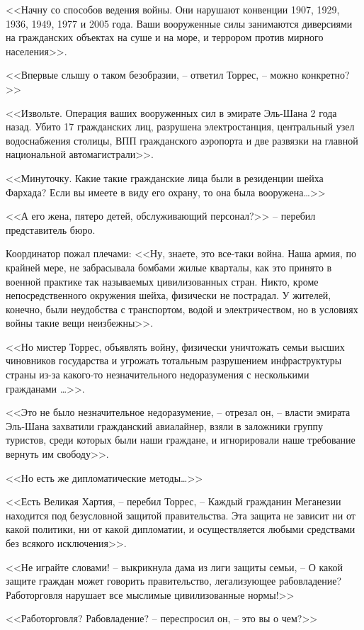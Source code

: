 <<Начну со способов ведения войны. Они нарушают конвенции 1907, 1929, 1936, 1949, 1977 и 2005 года. Ваши вооруженные силы занимаются диверсиями на гражданских объектах на суше и на море, и террором против мирного населения>>.

<<Впервые слышу о таком безобразии, -- ответил Торрес, -- можно конкретно?>>

<<Извольте. Операция ваших вооруженных сил в эмирате Эль-Шана 2 года назад. Убито 17 гражданских лиц, разрушена электростанция, центральный узел водоснабжения столицы, ВПП гражданского аэропорта и две развязки на главной национальной автомагистрали>>.

<<Минуточку. Какие такие гражданские лица были в резиденции шейха Фархада? Если вы имеете в виду его охрану, то она была вооружена\ldots{}>>

<<А его жена, пятеро детей, обслуживающий персонал?>> -- перебил представитель бюро.

Координатор пожал плечами: <<Ну, знаете, это все-таки война. Наша армия, по крайней мере, не забрасывала бомбами жилые кварталы, как это принято в военной практике так называемых цивилизованных стран. Никто, кроме непосредственного окружения шейха, физически не пострадал. У жителей, конечно, были неудобства с транспортом, водой и электричеством, но в условиях войны такие вещи неизбежны>>.

<<Но мистер Торрес, объявлять войну, физически уничтожать семьи высших чиновников государства и угрожать тотальным разрушением инфраструктуры страны из-за какого-то незначительного недоразумения с несколькими гражданами \ldots{}>>.

<<Это не было незначительное недоразумение, -- отрезал он, -- власти эмирата Эль-Шана захватили гражданский авиалайнер, взяли в заложники группу туристов, среди которых были наши граждане, и игнорировали наше требование вернуть им свободу>>.

<<Но есть же дипломатические методы\ldots{}>>

<<Есть Великая Хартия, -- перебил Торрес, -- Каждый гражданин Меганезии находится под безусловной защитой правительства. Эта защита не зависит ни от какой политики, ни от какой дипломатии, и осуществляется любыми средствами без всякого исключения>>.

<<Не играйте словами! -- выкрикнула дама из лиги защиты семьи, -- О какой защите граждан может говорить правительство, легализующее рабовладение? Работорговля нарушает все мыслимые цивилизованные нормы!>>

<<Работорговля? Рабовладение? -- переспросил он, -- это вы о чем?>>

